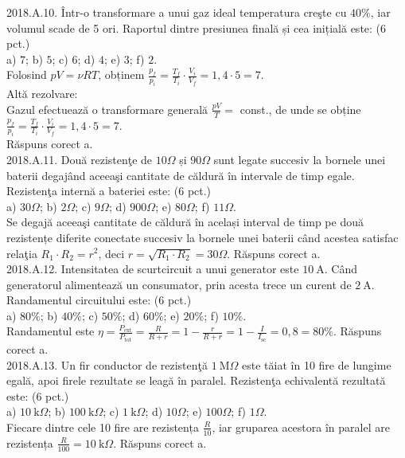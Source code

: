 2018.A.10. Într-o transformare a unui gaz ideal temperatura creşte cu $40 \%$, iar volumul scade de 5 ori. Raportul dintre presiunea finală și cea inițială este: (6 pct.)\\ a) $7$; b) $5$; c) $6$; d) $4$; e) $3$; f) $2$.\\ Folosind $p V=\nu R T$, obținem $\frac{p_{f}}{p_{i}}=\frac{T_{f}}{T_{i}} \cdot \frac{V_{i}}{V_{f}}=1,4 \cdot 5=7$.\\ Altă rezolvare:\\ Gazul efectuează o transformare generală $\frac{p V}{T}=$ const., de unde se obține $\frac{p_{f}}{p_{i}}=\frac{T_{f}}{T_{i}} \cdot \frac{V_{i}}{V_{f}}=1,4 \cdot 5=7$.\\ Răspuns corect a.\\

2018.A.11. Două rezistenţe de $10 \Omega$ și $90 \Omega$ sunt legate succesiv la bornele unei baterii degajând aceeaşi cantitate de căldură în intervale de timp egale. Rezistenţa internă a bateriei este: (6 pct.)\\ a) $30 \Omega$; b) $2 \Omega$; c) $9 \Omega$; d) $900 \Omega$; e) $80 \Omega$; f) $11 \Omega$.\\ Se degajă aceeaşi cantitate de căldură în același interval de timp pe două rezistențe diferite conectate succesiv la bornele unei baterii când acestea satisfac relaţia $R_{1} \cdot R_{2}=r^{2}$, deci $r=\sqrt{R_{1} \cdot R_{2}}=30 \Omega$. Răspuns corect a.\\

2018.A.12. Intensitatea de scurtcircuit a unui generator este $10 \mathrm{~A}$. Când generatorul alimentează un consumator, prin acesta trece un curent de $2 \mathrm{~A}$. Randamentul circuitului este: (6 pct.)\\ a) $80 \%$; b) $40 \%$; c) $50 \%$; d) $60 \%$; e) $20 \%$; f) $10 \%$.\\ Randamentul este $\eta=\frac{P_{\text {ext}}}{P_{\text {tot}}}=\frac{R}{R+r}=1-\frac{r}{R+r}=1-\frac{I}{I_{\text{sc}}}=0,8=80 \%$. Răspuns corect a.\\

2018.A.13. Un fir conductor de rezistenţă $1 \mathrm{~M} \Omega$ este tăiat în 10 fire de lungime egală, apoi firele rezultate se leagă în paralel. Rezistenţa echivalentă rezultată este: (6 pct.)\\ a) $10 \mathrm{~k} \Omega$; b) $100 \mathrm{~k} \Omega$; c) $1 \mathrm{~k} \Omega$; d) $10 \Omega$; e) $100 \Omega$; f) $1 \Omega$.\\ Fiecare dintre cele 10 fire are rezistența $\frac{R}{10}$, iar gruparea acestora în paralel are rezistența $\frac{R}{100}=10 \mathrm{~k} \Omega$. Răspuns corect a.\\

